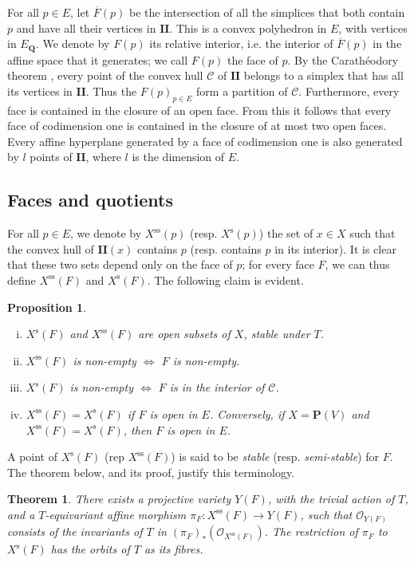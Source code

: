 \documentclass{article}
\theoremstyle{plain}
\newtheorem*{theorem}{Theorem}
\newtheorem*{proposition}{Proposition}
\theoremstyle{definition}
\newcommand{\scr}[1]{{\mathscr{#1}}}
\newcommand{\PP}{\mathbf{P}}
\newcommand{\QQ}{\mathbf{Q}}
\newcommand{\s}{\mathrm{s}}
\renewcommand{\ss}{\mathrm{ss}}
\newcommand{\II}{\mathbf{II}}
\newcommand{\oldpage}[1]{\marginpar{\footnotesize$\Big\vert$ \textit{p.~#1}}}
\begin{document}
For all $p\in E$, let $\overline{F}(p)$ be the intersection of all the simplices that both contain $p$ and have all their vertices in $\II$.
This is a convex polyhedron in $E$, with vertices in $E_\QQ$.
We denote by $F(p)$ its relative interior, i.e. the interior of $\overline{F}(p)$ in the affine space that it generates;
we call $F(p)$ the face of $p$.
By the Carath\'{e}odory theorem \cite[Theorem~1.21]{Val}, every point of the convex hull $\mathcal{C}$ of $\II$ belongs to a simplex that has all its vertices in $\II$.
Thus the $F(p)_{p\in E}$ form a partition of $\mathcal{C}$.
Furthermore, every face is contained in the closure of an open face.
From this it follows that every face of codimension one is contained in the closure of at most two open faces.
Every affine hyperplane generated by a face of codimension one is also generated by $l$ points of $\II$, where $l$ is the dimension of $E$.


\subsection{Faces and quotients}
\label{1.2}

For all $p\in E$, we denote by $X^\ss(p)$ (resp. $X^\s(p)$) the set of $x\in X$ such that the convex hull of $\II(x)$ contains $p$ (resp. contains $p$ in its interior).
It is clear that these two sets depend only on the face of $p$;
for every face $F$, we can thus define $X^\ss(F)$ and $X^\s(F)$.
The following claim is evident.

\begin{proposition}
  \begin{enumerate}[(i)]
    \item $X^\s(F)$ and $X^\ss(F)$ are open subsets of $X$, stable under $T$.
    \item $X^\ss(F)$ is non-empty $\iff$ $F$ is non-empty.
    \item $X^\s(F)$ is non-empty $\iff$ $F$ is in the interior of $\mathcal{C}$.
    \item $X^\ss(F)=X^\s(F)$ if $F$ is open in $E$.
      Conversely, if $X=\PP(V)$ and $X^\ss(F)=X^\s(F)$, then $F$ is open in $E$.
  \end{enumerate}
\end{proposition}

A point of $X^\s(F)$ (rep $X^\ss(F)$) is said to be \emph{stable} (resp. \emph{semi-stable}) for $F$.
The theorem below, and its proof, justify this terminology.

\begin{theorem}
\label{1.2-theorem}
  There exists a projective variety $Y(F)$, with the trivial action
\oldpage{513}
  of $T$, and a $T$-equivariant affine morphism $\pi_F\colon X^\ss(F)\to Y(F)$, such that $\scr{O}_{Y(F)}$ consists of the invariants of $T$ in $(\pi_F)_*(\scr{O}_{X^\ss(F)})$.
  The restriction of $\pi_F$ to $X^\s(F)$ has the orbits of $T$ as its fibres.
\end{theorem}
\end{document}
